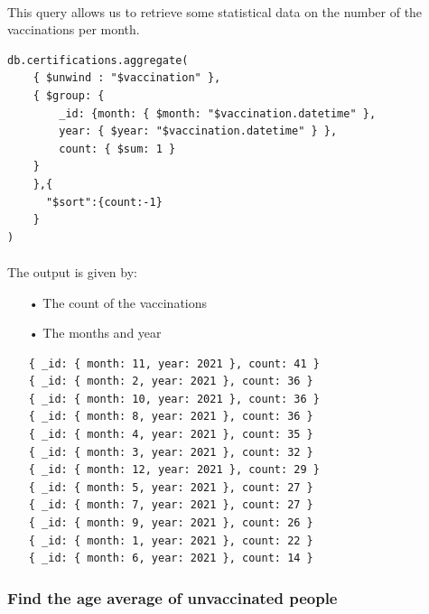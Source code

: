 \documentclass[a4paper,12pt]{article}
\begin{document}
\paragraph{} This query allows us to retrieve some statistical data on the number of the vaccinations per month.
\begin{tcolorbox}[colback=green!5!white,colframe=green!75!black,title=QUERY]
\begin{verbatim}
db.certifications.aggregate(
    { $unwind : "$vaccination" }, 
    { $group: {
        _id: {month: { $month: "$vaccination.datetime" },
        year: { $year: "$vaccination.datetime" } },
        count: { $sum: 1 }
    }
    },{
      "$sort":{count:-1}
    }
)
\end{verbatim}
\end{tcolorbox}
\paragraph{} The output is given by: 
\begin{itemize}[noitemsep]
\item[•] The count of the vaccinations
\item[•] The months and year
\begin{tcolorbox}[colback=red!5!white,colframe=red!75!black,title=OUTPUT]
\begin{verbatim}
{ _id: { month: 11, year: 2021 }, count: 41 }
{ _id: { month: 2, year: 2021 }, count: 36 }
{ _id: { month: 10, year: 2021 }, count: 36 }
{ _id: { month: 8, year: 2021 }, count: 36 }
{ _id: { month: 4, year: 2021 }, count: 35 }
{ _id: { month: 3, year: 2021 }, count: 32 }
{ _id: { month: 12, year: 2021 }, count: 29 }
{ _id: { month: 5, year: 2021 }, count: 27 }
{ _id: { month: 7, year: 2021 }, count: 27 }
{ _id: { month: 9, year: 2021 }, count: 26 }
{ _id: { month: 1, year: 2021 }, count: 22 }
{ _id: { month: 6, year: 2021 }, count: 14 }
\end{verbatim}
\end{tcolorbox}

\end{itemize}
\subsubsection{Find the age average of unvaccinated people}
\end{document}
